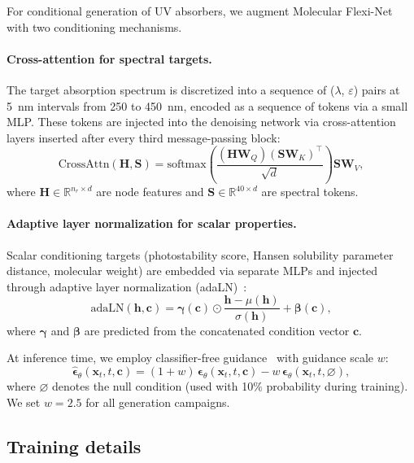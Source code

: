 \documentclass[11pt]{article}
\newcommand{\vx}{\mathbf{x}}
\newcommand{\ve}{\boldsymbol{\epsilon}}
\newcommand{\R}{\mathbb{R}}
\begin{document}
For conditional generation of UV absorbers, we augment Molecular Flexi-Net with two conditioning mechanisms.

\paragraph{Cross-attention for spectral targets.} The target absorption spectrum is discretized into a sequence of ($\lambda$, $\varepsilon$) pairs at 5~nm intervals from 250 to 450~nm, encoded as a sequence of tokens via a small MLP. These tokens are injected into the denoising network via cross-attention layers inserted after every third message-passing block:
\begin{equation}
    \text{CrossAttn}(\mathbf{H}, \mathbf{S}) = \text{softmax}\!\left(\frac{(\mathbf{H}\mathbf{W}_Q)(\mathbf{S}\mathbf{W}_K)^\top}{\sqrt{d}}\right)\mathbf{S}\mathbf{W}_V,
\end{equation}
where $\mathbf{H} \in \R^{n_r \times d}$ are node features and $\mathbf{S} \in \R^{40 \times d}$ are spectral tokens.

\paragraph{Adaptive layer normalization for scalar properties.} Scalar conditioning targets (photostability score, Hansen solubility parameter distance, molecular weight) are embedded via separate MLPs and injected through adaptive layer normalization (adaLN)~\cite{peebles2023dit}:
\begin{equation}
    \text{adaLN}(\mathbf{h}, \mathbf{c}) = \boldsymbol{\gamma}(\mathbf{c}) \odot \frac{\mathbf{h} - \mu(\mathbf{h})}{\sigma(\mathbf{h})} + \boldsymbol{\beta}(\mathbf{c}),
\end{equation}
where $\boldsymbol{\gamma}$ and $\boldsymbol{\beta}$ are predicted from the concatenated condition vector $\mathbf{c}$.

At inference time, we employ classifier-free guidance~\cite{ho2022classifierfree} with guidance scale $w$:
\begin{equation}
    \hat{\ve}_\theta(\vx_t, t, \mathbf{c}) = (1+w)\,\ve_\theta(\vx_t, t, \mathbf{c}) - w\,\ve_\theta(\vx_t, t, \varnothing),
\end{equation}
where $\varnothing$ denotes the null condition (used with 10\% probability during training). We set $w = 2.5$ for all generation campaigns.


\subsection*{Training details}
\end{document}
